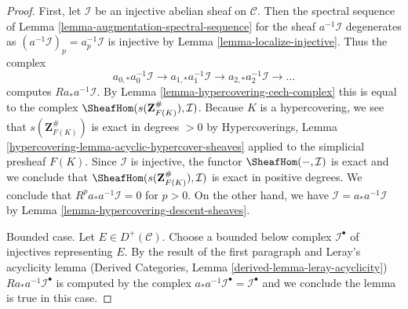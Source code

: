 \begin{proof}
First, let $\mathcal{I}$ be an injective abelian sheaf on $\mathcal{C}$.
Then the spectral sequence of
Lemma \ref{lemma-augmentation-spectral-sequence}
for the sheaf $a^{-1}\mathcal{I}$ degenerates as
$(a^{-1}\mathcal{I})_p = a_p^{-1}\mathcal{I}$
is injective by Lemma \ref{lemma-localize-injective}.
Thus the complex
$$
a_{0, *}a_0^{-1}\mathcal{I} \to
a_{1, *}a_1^{-1}\mathcal{I} \to
a_{2, *}a_2^{-1}\mathcal{I} \to\ldots
$$
computes $Ra_*a^{-1}\mathcal{I}$. By
Lemma \ref{lemma-hypercovering-cech-complex}
this is equal to the complex
$\SheafHom(s(\mathbf{Z}_{F(K)}^\#), \mathcal{I})$.
Because $K$ is a hypercovering, we see that
$s(\mathbf{Z}_{F(K)}^\#)$ is exact in degrees $> 0$ by
Hypercoverings, Lemma \ref{hypercovering-lemma-acyclic-hypercover-sheaves}
applied to the simplicial presheaf $F(K)$.
Since $\mathcal{I}$ is injective, the functor $\SheafHom(-, \mathcal{I})$
is exact and we conclude that
$\SheafHom(s(\mathbf{Z}_{F(K)}^\#), \mathcal{I})$
is exact in positive degrees. We conclude that
$R^pa_*a^{-1}\mathcal{I} = 0$ for $p > 0$.
On the other hand, we have $\mathcal{I} = a_*a^{-1}\mathcal{I}$
by Lemma \ref{lemma-hypercovering-descent-sheaves}.

\medskip\noindent
Bounded case. Let $E \in D^+(\mathcal{C})$.
Choose a bounded below complex $\mathcal{I}^\bullet$ of injectives
representing $E$. By the result of the first paragraph and
Leray's acyclicity lemma
(Derived Categories, Lemma \ref{derived-lemma-leray-acyclicity})
$Ra_*a^{-1}\mathcal{I}^\bullet$
is computed by the complex
$a_*a^{-1}\mathcal{I}^\bullet = \mathcal{I}^\bullet$
and we conclude the lemma is true in this case.


\end{proof}
